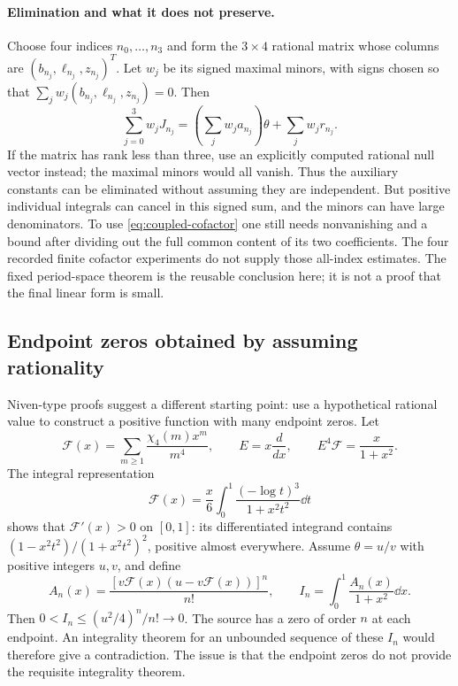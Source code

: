 \paragraph{Elimination and what it does not preserve.}
Choose four indices $n_0,\ldots,n_3$ and form the $3\times4$ rational
matrix whose columns are $(b_{n_j},\ell_{n_j},z_{n_j})^T$.
Let $w_j$ be its signed maximal minors, with signs chosen so that
$\sum_jw_j(b_{n_j},\ell_{n_j},z_{n_j})=0$. Then
\begin{equation}\label{eq:coupled-cofactor}
 \sum_{j=0}^3w_jJ_{n_j}
 =\left(\sum_jw_ja_{n_j}\right)\theta+\sum_jw_jr_{n_j}.
\end{equation}
If the matrix has rank less than three, use an explicitly computed
rational null vector instead; the maximal minors would all vanish.
Thus the auxiliary constants can be eliminated without assuming they
are independent. But positive individual integrals can cancel in this
signed sum, and the minors can have large denominators. To use
\eqref{eq:coupled-cofactor} one still needs nonvanishing and a bound
after dividing out the full common content of its two coefficients.
The four recorded finite cofactor experiments do not supply those
all-index estimates. The fixed period-space theorem is the reusable
conclusion here; it is not a proof that the final linear form is small.

\subsection{Endpoint zeros obtained by assuming rationality}
\label{subsec:niven-case}
Niven-type proofs suggest a different starting point: use a hypothetical
rational value to construct a positive function with many endpoint zeros.
Let
\[
 \mathcal F(x)=\sum_{m\geq1}\frac{\chi_4(m)x^m}{m^4},\qquad
 E=x\frac{d}{dx},\qquad E^4\mathcal F=\frac{x}{1+x^2}.
\]
The integral representation
\[
 \mathcal F(x)=\frac{x}{6}\int_0^1
                       \frac{(-\log t)^3}{1+x^2t^2}\dd t
\]
shows that $\mathcal F'(x)>0$ on $[0,1]$: its differentiated
integrand contains $(1-x^2t^2)/(1+x^2t^2)^2$, positive almost everywhere.
Assume $\theta=u/v$ with positive integers $u,v$, and define
\begin{equation}\label{eq:niven-source}
 A_n(x)=\frac{[v\mathcal F(x)(u-v\mathcal F(x))]^n}{n!},\qquad
 I_n=\int_0^1\frac{A_n(x)}{1+x^2}\dd x.
\end{equation}
Then $0<I_n\leq(u^2/4)^n/n!\to0$. The source has a zero of order
$n$ at each endpoint. An integrality theorem for an unbounded sequence
of these $I_n$ would therefore give a contradiction. The issue is that
the endpoint zeros do not provide the requisite integrality theorem.

